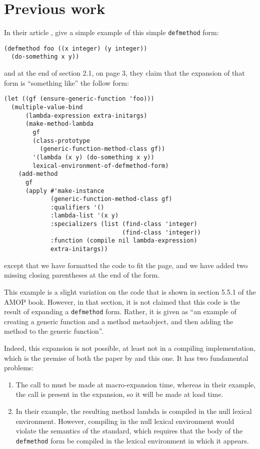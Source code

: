\section{Previous work}

In their article \cite{Constanza:2008}, \cnh{} give a
simple example of this simple \texttt{defmethod} form:

\begin{verbatim}
(defmethod foo ((x integer) (y integer))
  (do-something x y))
\end{verbatim}

\noindent
and at the end of section 2.1, on page 3, they claim that the
expansion of that form is ``something like'' the follow form:

{\small\begin{verbatim}
(let ((gf (ensure-generic-function 'foo)))
  (multiple-value-bind
      (lambda-expression extra-initargs)
      (make-method-lambda
        gf
        (class-prototype
          (generic-function-method-class gf))
        '(lambda (x y) (do-something x y))
        lexical-environment-of-defmethod-form)
    (add-method
      gf
      (apply #'make-instance
             (generic-function-method-class gf)
             :qualifiers '()
             :lambda-list '(x y)
             :specializers (list (find-class 'integer)
                                 (find-class 'integer))
             :function (compile nil lambda-expression)
             extra-initargs))
\end{verbatim}}

\noindent
except that we have formatted the code to fit the page, and we have
added two missing closing parentheses at the end of the form.

This example is a slight variation on the code that is shown in
section 5.5.1 of the AMOP book.  However, in that section, it is not
claimed that this code is the result of expanding a \texttt{defmethod}
form.  Rather, it is given as ``an example of creating a generic
function and a method metaobject, and then adding the method to the
generic function''.

Indeed, this expansion is not possible, at least not in a compiling
implementation, which is the premise of both the paper by \cnh{} and
this one.  It has two fundamental problems:

\begin{enumerate}
\item The call to \mml{} must be made at macro-expansion time, whereas
  in their example, the call is present in the expansion, so it will
  be made at load time.
\item In their example, the resulting method lambda is compiled in the
  null lexical environment.  However, compiling in the null lexical
  environment would violate the semantics of the \commonlisp{}
  standard, which requires that the body of the \texttt{defmethod}
  form be compiled in the lexical environment in which it appears.
\end{enumerate}

